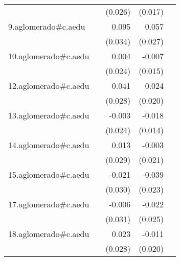 {\begin{longtable}{l*{4}{D{.}{.}{-1}}}
            &                     &     (0.026)         &     (0.017)         &                     \\
\addlinespace
9.aglomerado#c.aedu&                     &       0.095\sym{**} &       0.057\sym{*}  &                     \\
            &                     &     (0.034)         &     (0.027)         &                     \\
\addlinespace
10.aglomerado#c.aedu&                     &       0.004         &      -0.007         &                     \\
            &                     &     (0.024)         &     (0.015)         &                     \\
\addlinespace
12.aglomerado#c.aedu&                     &       0.041         &       0.024         &                     \\
            &                     &     (0.028)         &     (0.020)         &                     \\
\addlinespace
13.aglomerado#c.aedu&                     &      -0.003         &      -0.018         &                     \\
            &                     &     (0.024)         &     (0.014)         &                     \\
\addlinespace
14.aglomerado#c.aedu&                     &       0.013         &      -0.003         &                     \\
            &                     &     (0.029)         &     (0.021)         &                     \\
\addlinespace
15.aglomerado#c.aedu&                     &      -0.021         &      -0.039         &                     \\
            &                     &     (0.030)         &     (0.023)         &                     \\
\addlinespace
17.aglomerado#c.aedu&                     &      -0.006         &      -0.022         &                     \\
            &                     &     (0.031)         &     (0.025)         &                     \\
\addlinespace
18.aglomerado#c.aedu&                     &       0.023         &      -0.011         &                     \\
            &                     &     (0.028)         &     (0.020)         &                     \\

\end{longtable}}
